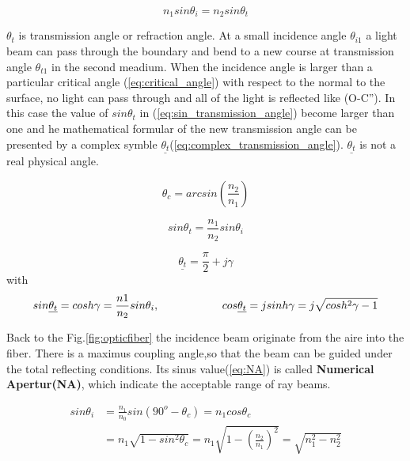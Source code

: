 \begin{equation}
n_{1}sin\theta_{i}=n_{2}sin\theta_{t}
\label{eq:snell}
\end{equation}

$\theta_{t}$ is transmission angle or refraction angle.
At a small incidence angle $\theta_{i1}$ a light beam can pass through the boundary and bend to a new course at transmission angle $\theta_{t1}$ in the second meadium.
When the incidence angle is larger than a particular critical angle (\ref{eq:critical_angle}) with respect to the normal to the surface, no light can pass through and all of the light is reflected like (O-C''). In this case the value of $sin\theta_{t}$ in (\ref{eq:sin_transmission_angle}) become larger than one and he mathematical formular of the new transmission angle can be presented by a complex symble $\underline{\theta_{t}}$(\ref{eq:complex_transmission_angle}). $\underline{\theta_{t}}$ is not a real physical angle.

\begin{equation}
\theta_{c}=arcsin(\frac{n_{2}}{n_{1}})
\label{eq:critical_angle}
\end{equation}

\begin{equation}
sin\theta_{t}=\frac{n_{1}}{n_{2}}sin\theta_{i}
\label{eq:sin_transmission_angle}
\end{equation}

\begin{equation}
\underline{\theta_{t}}=\frac{\pi}{2}+j\gamma
\label{eq:complex_transmission_angle}
\end{equation}
with
\begin{equation}
sin\underline{\theta_{t}}=cosh\gamma=\frac{n{1}}{n_{2}}sin\theta_{i},\hspace{2cm}\hfill cos\underline{\theta_{t}}=jsinh\gamma=j\sqrt{cosh^2\gamma-1}
\label{eq:trangle_transmission_angle}
\end{equation}


Back to the Fig.\ref{fig:opticfiber} the incidence beam originate from the aire into the fiber. There is a maximus coupling angle,so that the beam can be guided under the total reflecting conditions. Its sinus value(\ref{eq:NA}) is called \textbf{Numerical Apertur(NA)}, which indicate the acceptable range of ray beams.

\begin{align}
sin\theta_{i}&=\frac{n_{1}}{n_{0}}sin(90^{o}-\theta_{c})=n_{1}cos\theta_{c} \nonumber\\
&=n_{1}\sqrt{1-sin^{2}\theta_{c}}=n_{1}\sqrt{1-\left(\frac{n_{2}}{n_{1}}\right)^2}=\sqrt{n^2_{1}-n^2_{2}}
\label{eq:NA}
\end{align}
